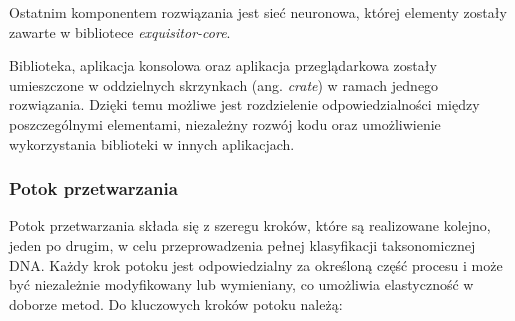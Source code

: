         Ostatnim komponentem rozwiązania jest sieć neuronowa, której elementy zostały zawarte w bibliotece \textit{exquisitor-core}. 

        Biblioteka, aplikacja konsolowa oraz aplikacja przeglądarkowa zostały umieszczone w oddzielnych skrzynkach (ang. \textit{crate}) w ramach jednego rozwiązania. Dzięki temu możliwe jest rozdzielenie odpowiedzialności między poszczególnymi elementami, niezależny rozwój kodu oraz umożliwienie wykorzystania biblioteki w innych aplikacjach.


        \subsubsection{Potok przetwarzania}

            Potok przetwarzania składa się z szeregu kroków, które są realizowane kolejno, jeden po drugim, w celu przeprowadzenia pełnej klasyfikacji taksonomicznej DNA. Każdy krok potoku jest odpowiedzialny za określoną część procesu i może być niezależnie modyfikowany lub wymieniany, co umożliwia elastyczność w doborze metod. Do kluczowych kroków potoku należą:

